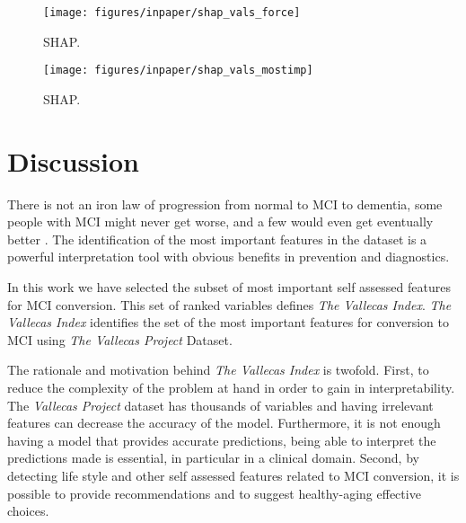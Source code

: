 \documentclass[preprint,12pt]{elsarticle}
\begin{document}
\begin{figure}[!htb]
        \centering
        \texttt{[image: figures/inpaper/shap\_vals\_force]}
        \caption{SHAP.} 
        \label{fig:SHAPbar2}
\end{figure}

\begin{figure}[!htb]
        \centering
        \texttt{[image: figures/inpaper/shap\_vals\_mostimp]}
        \caption{SHAP.} 
        \label{fig:SHAPbar3}
\end{figure}



\section{Discussion}
\label{se:dis}

There is not an iron law of progression from normal to MCI to dementia, some people with MCI might never get worse, and a few would even get eventually better \cite{avila2017subjective}. The identification of the most important features in the dataset is a powerful interpretation tool with obvious benefits in prevention and diagnostics. 

In this work we have selected the subset of most important self assessed features for MCI conversion. This set of ranked variables defines \emph{The Vallecas Index}. 
\emph{The Vallecas Index} identifies the set of the most important features for conversion to MCI using \emph{The Vallecas Project} Dataset. 

The rationale and motivation behind \emph{The Vallecas Index} is twofold. First, to reduce the complexity of the problem at hand in order to gain in interpretability. The \emph{Vallecas Project} dataset has thousands of variables and having irrelevant features can decrease the accuracy of the model. Furthermore, it is not enough having a model that provides accurate predictions, being able to interpret the predictions made is essential, in particular in a clinical domain.
Second, by detecting life style and other self assessed features related to MCI conversion, it is possible to provide recommendations and to suggest healthy-aging effective choices.
\end{document}
